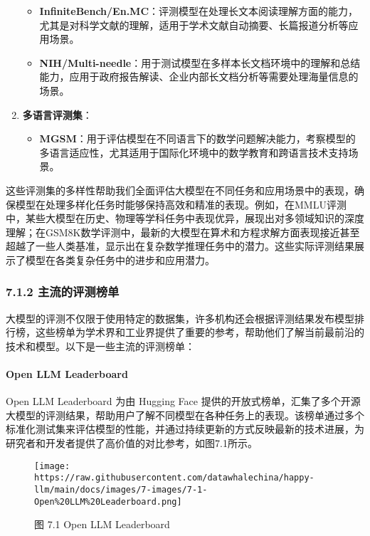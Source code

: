 \documentclass[
]{article}
\providecommand{\tightlist}{%
  \setlength{\itemsep}{0pt}\setlength{\parskip}{0pt}}
\begin{document}
\begin{enumerate}
  \begin{itemize}
  \tightlist
  \item
    \textbf{InfiniteBench/En.MC}：评测模型在处理长文本阅读理解方面的能力，尤其是对科学文献的理解，适用于学术文献自动摘要、长篇报道分析等应用场景。
  \item
    \textbf{NIH/Multi-needle}：用于测试模型在多样本长文档环境中的理解和总结能力，应用于政府报告解读、企业内部长文档分析等需要处理海量信息的场景。
  \end{itemize}
\item
  \textbf{多语言评测集}：

  \begin{itemize}
  \tightlist
  \item
    \textbf{MGSM}：用于评估模型在不同语言下的数学问题解决能力，考察模型的多语言适应性，尤其适用于国际化环境中的数学教育和跨语言技术支持场景。
  \end{itemize}
\end{enumerate}

这些评测集的多样性帮助我们全面评估大模型在不同任务和应用场景中的表现，确保模型在处理多样化任务时能够保持高效和精准的表现。例如，在MMLU评测中，某些大模型在历史、物理等学科任务中表现优异，展现出对多领域知识的深度理解；在GSM8K数学评测中，最新的大模型在算术和方程求解方面表现接近甚至超越了一些人类基准，显示出在复杂数学推理任务中的潜力。这些实际评测结果展示了模型在各类复杂任务中的进步和应用潜力。

\subsubsection{7.1.2
主流的评测榜单}\label{ux4e3bux6d41ux7684ux8bc4ux6d4bux699cux5355}

大模型的评测不仅限于使用特定的数据集，许多机构还会根据评测结果发布模型排行榜，这些榜单为学术界和工业界提供了重要的参考，帮助他们了解当前最前沿的技术和模型。以下是一些主流的评测榜单：

\paragraph{Open LLM Leaderboard}\label{open-llm-leaderboard}

Open LLM Leaderboard 为由 Hugging Face
提供的开放式榜单，汇集了多个开源大模型的评测结果，帮助用户了解不同模型在各种任务上的表现。该榜单通过多个标准化测试集来评估模型的性能，并通过持续更新的方式反映最新的技术进展，为研究者和开发者提供了高价值的对比参考，如图7.1所示。

\begin{figure}[htbp]\centering
\texttt{[image: https://raw.githubusercontent.com/datawhalechina/happy-llm/main/docs/images/7-images/7-1-Open\%20LLM\%20Leaderboard.png]}
\caption{图 7.1 Open LLM Leaderboard}
\end{figure}
\end{document}
